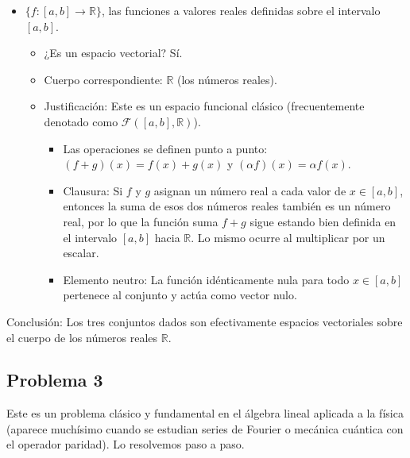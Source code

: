 \documentclass[11pt,spanish]{article}
\newcounter{problema}
\begin{document}
\begin{itemize}
Nota: Si el conjunto fuera los polinomios de grado EXACTAMENTE $N$, entonces no sería un espacio vectorial, porque al sumar $x^N$ y $-x^N$ obtendrías $0$, que no tiene grado $N$, perdiendo la clausura y el elemento neutro.

\item[$c)$] $\{f:[a,b]\to\mathbb{R}\}$, las funciones a valores reales definidas sobre el intervalo $[a,b]$.

\begin{itemize}
\item ¿Es un espacio vectorial? Sí.
\item Cuerpo correspondiente: $\mathbb{R}$ (los números reales).
\item Justificación: Este es un espacio funcional clásico (frecuentemente denotado como $\mathcal{F}([a,b], \mathbb{R})$).
\begin{itemize}
\item Las operaciones se definen punto a punto: $(f+g)(x) = f(x) + g(x)$ y $(\alpha f)(x) = \alpha f(x)$.
\item Clausura: Si $f$ y $g$ asignan un número real a cada valor de $x \in [a,b]$, entonces la suma de esos dos números reales también es un número real, por lo que la función suma $f+g$ sigue estando bien definida en el intervalo $[a,b]$ hacia $\mathbb{R}$. Lo mismo ocurre al multiplicar por un escalar.
\item Elemento neutro: La función idénticamente nula para todo $x \in [a,b]$ pertenece al conjunto y actúa como vector nulo.
\end{itemize}
\end{itemize}
\end{itemize}

Conclusión: Los tres conjuntos dados son efectivamente espacios vectoriales sobre el cuerpo de los números reales $\mathbb{R}$.

\subsection*{Problema 3}

Este es un problema clásico y fundamental en el álgebra lineal aplicada a la física (aparece muchísimo cuando se estudian series de Fourier o mecánica cuántica con el operador paridad).
Lo resolvemos paso a paso.
\end{document}
